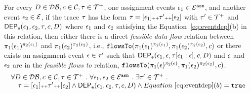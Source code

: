 \begin{lem}
		\label{lem:inv_indepevents_asn}
		For every $D \in \mathcal{DB} , c \in \mathcal{C}, \mathtt{\tau} \in \mathcal{T}^{+}$, one assignment events 
		$\mathtt{\epsilon}_1\in \mathcal{E}^{\mathtt{{asn}}}$, and another event $\mathtt{\epsilon}_2 \in \mathcal{E}$,
		if the trace $\mathtt{\tau}$ has the form $\mathtt{\tau} = [\mathtt{\epsilon}_1] {\scriptscriptstyle ++} \mathtt{\tau}' {\scriptscriptstyle ++} [\mathtt{\epsilon}_2]$ with $\mathtt{\tau}' \in \mathcal{T}^{+}$
		and $\mathsf{DEP_{\mathtt{e}}}(\mathtt{\epsilon}_1, \mathtt{\epsilon}_2, \mathtt{\tau}, c, D)$
		where $\mathtt{\epsilon}_1$ and $\mathtt{\epsilon}_2$ satisfying the Equation~\ref{eq:eventdep}(b)
		in this relation,
		then either there is a direct \emph{feasible data-flow} relation between
		$\pi_1(\mathtt{\epsilon}_1)^{\pi_2(\mathtt{\epsilon}_1)}$ and $\pi_1(\mathtt{\epsilon}_2)^{\pi_2(\mathtt{\epsilon}_2)}$, i.e.,
		$\mathtt{flowsTo}(\pi_1(\mathtt{\epsilon}_1)^{\pi_2(\mathtt{\epsilon}_1)}, \pi_1(\mathtt{\epsilon}_2)^{\pi_2(\mathtt{\epsilon}_2)}, c)$
		or
		there exists an assignment event $\mathtt{\epsilon} \in \mathtt{\tau}'$
		such that
		$\mathsf{DEP_{\mathtt{e}}}(\mathtt{\epsilon}_1, \mathtt{\epsilon}, \mathtt{\tau}[\mathtt{\epsilon}_1:\mathtt{\epsilon}], c, D)$ and 
		$\mathtt{\epsilon}$ and $\mathtt{\epsilon}_2$ are in the \emph{feasible flows to} relation,
		$\mathtt{flowsTo}(\pi_1(\mathtt{\epsilon})^{\pi_2(\mathtt{\epsilon})}, \pi_1(\mathtt{\epsilon}_2)^{\pi_2(\mathtt{\epsilon}_2)}, c)$.
		\[
		\begin{array}{l}
			\forall D \in \mathcal{DB} , c \in \mathcal{C}, \mathtt{\tau} \in \mathcal{T}^{+} ~.~  \forall \mathtt{\epsilon}_1, \mathtt{\epsilon}_2 \in \mathcal{E}^{\mathtt{{asn}}} ~.~ 
			 \exists \mathtt{\tau}' \in \mathcal{T}^{+} ~.~
			 \\ \quad 
			 \mathtt{\tau} = [\mathtt{\epsilon}_1] {\scriptscriptstyle ++} \mathtt{\tau}' {\scriptscriptstyle ++} [\mathtt{\epsilon}_2]
			 \land
			\mathsf{DEP_{\mathtt{e}}}(\mathtt{\epsilon}_1, \mathtt{\epsilon}_2, \mathtt{\tau}, c, D) 
			\land Equation~\ref{eq:eventdep}(b) = \mathtt{true}

\end{array}\]
\end{lem}

